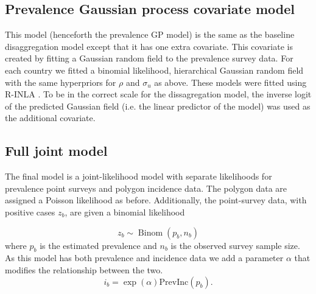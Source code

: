 \documentclass{statsoc}
\begin{document}
%
%
%
%
%
%
%

\subsection*{Prevalence Gaussian process covariate model}

This model (henceforth the prevalence GP model) is the same as the baseline disaggregation model except that it has one extra covariate.
This covariate is created by fitting a Gaussian random field to the prevalence survey data.
For each country we fitted a binomial likelihood, hierarchical Gaussian random field with the same hyperpriors for $\rho$ and $\sigma_u$ as above.
These models were fitted using R-INLA \citep{INLA}.
To be in the correct scale for the dissagregation model, the inverse logit of the predicted Gaussian field (i.e. the linear predictor of the model) was used as the additional covariate.

\subsection*{Full joint model}

The final model is a joint-likelihood model with separate likelihoods for prevalence point surveys and polygon incidence data.
The polygon data are assigned a Poisson likelihood as before.
Additionally, the point-survey data, with positive cases $z_b$, are given a binomial likelihood

$$z_b \sim \operatorname{Binom}(p_b, n_b) $$
where $p_b$ is the estimated prevalence and $n_b$ is the observed survey sample size. 
As this model has both prevalence and incidence data we add a parameter $\alpha$ that modifies the relationship between the two.
$$i_b = \exp(\alpha)\mathrm{PrevInc}(p_b).$$
\end{document}

